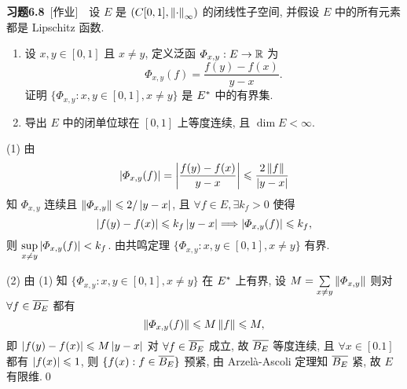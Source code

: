 	\textbf{习题6.8}\ [作业]\ \ 设 $ E $ 是 $ (C[0, 1], \norm{\cdot}_{\infty}) $ 的闭线性子空间, 并假设 $ E $ 中的所有元素都是 Lipschitz 函数.
	\begin{enumerate}[(1)]
		\item 设 $ x, y\in[0, 1] $ 且 $ x\ne y $, 定义泛函 $ \varPhi_{x, y}:E\to\R $ 为
		\[
			\varPhi_{x, y}(f)=\frac{f(y)-f(x)}{y-x}.
		\]
		证明 $\{ \varPhi_{x, y}:x, y\in[0, 1], x\ne y \}$ 是 $ \Star{E} $ 中的有界集.
		\item 导出 $ E $ 中的闭单位球在 $ [0, 1] $ 上等度连续, 且 $ \dim E<\infty $.
	\end{enumerate}
	\begin{Proof}
		(1) 由
		\[
			\abs{\varPhi_{x, y}(f)}=\abs{\frac{f(y)-f(x)}{y-x}}\leqslant\frac{2\norm{f}}{\abs{y-x}}
		\]
		知 $ \varPhi_{x, y} $ 连续且 $ \norm{\varPhi_{x, y}}\leqslant2/\abs{y-x} $, 且 $ \forall f\in E, \exists k_{f}>0 $ 使得
		\[
			\abs{f(y)-f(x)}\leqslant k_{f}\abs{y-x}\Longrightarrow \abs{\varPhi_{x, y}(f)}\leqslant k_{f},
		\]
		则 $\sup\limits_{x\ne y}\abs{\varPhi_{x, y}(f)}<k_{f} $. 由共鸣定理 $\{ \varPhi_{x, y}:x, y\in[0, 1], x\ne y \}$ 有界.

		(2) 由 (1) 知 $\{ \varPhi_{x, y}:x, y\in[0, 1], x\ne y \}$ 在 $ \Star{E} $ 上有界, 设 $ M=\sum\limits_{x\ne y}\norm{\varPhi_{x, y}} $ 则对 $ \forall f\in\baro{B_{E}} $ 都有
		\[
			\norm{\varPhi_{x, y}(f)}\leqslant M\norm{f}\leqslant M,
		\]
		即 $ \abs{f(y)-f(x)}\leqslant M\abs{y-x} $ 对 $ \forall f\in\baro{B_{E}} $ 成立, 故 $ \baro{B_{E}} $ 等度连续, 且 $ \forall x\in[0. 1] $ 都有 $ \abs{f(x)}\leqslant 1 $, 则 $ \{ f(x):f\in\baro{B_{E}} \} $ 预紧, 由 Arzel\`a-Ascoli 定理知 $ \baro{B_{E}} $ 紧, 故 $ E $ 有限维.\qed
	\end{Proof}

